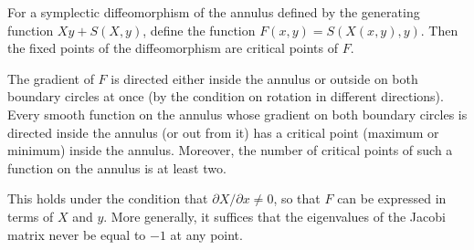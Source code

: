 For a symplectic diffeomorphism of the annulus defined by the generating function $Xy + S(X, y)$, define the function $F(x, y) = S(X(x, y), y)$. Then the fixed points of the diffeomorphism are critical points of $F$.

The gradient of $F$ is directed either inside the annulus or outside on both boundary circles at once (by the condition on rotation in different directions). Every smooth function on the annulus whose gradient on both boundary circles is directed inside the annulus (or out from it) has a critical point (maximum or minimum) inside the annulus. Moreover, the number of critical points of such a function on the annulus is at least two.

This holds under the condition that $\partial X / \partial x \neq 0$, so that $F$ can be expressed in terms of $X$ and $y$. More generally, it suffices that the eigenvalues of the Jacobi matrix never be equal to $-1$ at any point.
